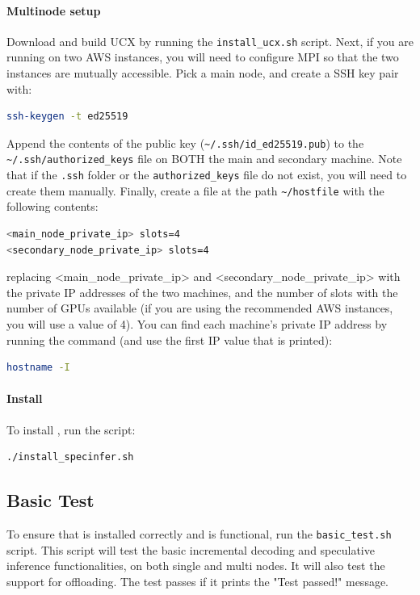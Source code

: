 \paragraph{Multinode setup}
Download and build UCX by running the \texttt{install\_ucx.sh} script. Next, if you are running \sys on two AWS instances, you will need to configure MPI so that the two instances are mutually accessible. Pick a main node, and create a SSH key pair with:
\begin{lstlisting}[language=sh]
    ssh-keygen -t ed25519
\end{lstlisting}
Append the contents of the public key (\texttt{\textasciitilde/.ssh/id\_ed25519.pub}) to the \texttt{\textasciitilde/.ssh/authorized\_keys} file on BOTH the main and secondary machine. Note that if the \texttt{.ssh} folder or the \texttt{authorized\_keys} file do not exist, you will need to create them manually. 
Finally, create a file at the path \texttt{\textasciitilde/hostfile} with the following contents:
\begin{lstlisting}[language=sh]
<main_node_private_ip> slots=4
<secondary_node_private_ip> slots=4
\end{lstlisting}
replacing <main\_node\_private\_ip> and <secondary\_node\_private\_ip> with the private IP addresses of the two machines, and the number of slots with the number of GPUs available (if you are using the recommended AWS instances, you will use a value of 4). You can find each machine's private IP address by running the command (and use the first IP value that is printed):
\begin{lstlisting}[language=sh]
    hostname -I
\end{lstlisting}

\paragraph{Install \sys}

To install \sys, run the script: 
\begin{lstlisting}[language=sh]
./install_specinfer.sh
\end{lstlisting}

\subsection{Basic Test}
To ensure that \sys is installed correctly and is functional, run the \texttt{basic\_test.sh} script. This script will test the basic incremental decoding and speculative inference functionalities, on both single and multi nodes. It will also test the support for offloading. The test passes if it prints the "Test passed!" message. 

